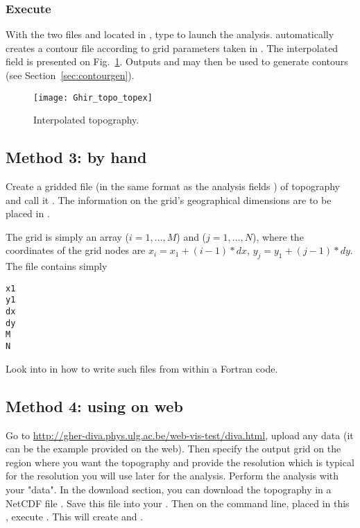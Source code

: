 \subsubsection{Execute }

With the two files  and  located in , type  to launch the analysis.  automatically creates a contour file according to grid parameters taken in . The interpolated field is presented on Fig.~\ref{fig:guirtopodiva}. Outputs  and  may then be used to generate contours (see Section~\ref{sec:contourgen}). 



\begin{figure}[htpb]
\centering
\texttt{[image: Ghir\_topo\_topex]}
\caption{Interpolated topography.\label{fig:guirtopodiva}}
\end{figure}


\subsection{Method 3: by hand}

Create a gridded file (in the same format as the analysis fields ) of topography and call
it . The information on the grid's geographical dimensions are to be placed in .

The grid is simply an array ($i=1,\ldots,M$) and ($j=1,\ldots,N$), where the coordinates of the grid nodes are
$x_i=x_1+(i-1)*dx$, $y_j=y_1+(j-1)*dy$.  The file  contains simply
\begin{verbatim}
x1
y1
dx
dy
M
N
\end{verbatim}


Look into  in  how to write such files from within a Fortran code.



\subsection{Method 4: using \diva on web}

Go to \url{http://gher-diva.phys.ulg.ac.be/web-vis-test/diva.html}, upload any data (it can be the example provided on the web).
Then specify the output grid on the region where you want the topography and provide the resolution which is typical for the resolution you will use later for the analysis.
Perform the analysis with your "data". In the download section, you can download the topography in a NetCDF file . Save this file into your . Then on the command line, placed in this , execute . This will create  and .

